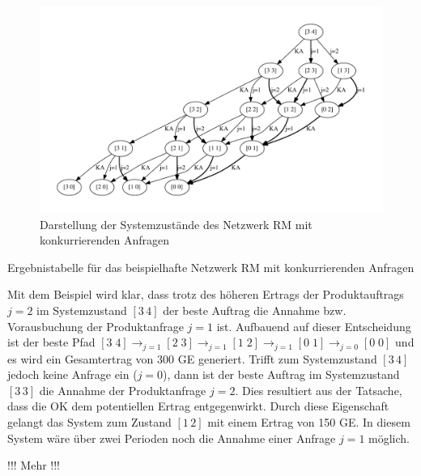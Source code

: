 \begin{figure}[h!]
  \begin{center}
    \includegraphics[width=150mm]{Bilder/Beispiel2.pdf}
    \caption{Darstellung der Systemzustände des Netzwerk RM mit konkurrierenden Anfragen}  \label{B2}
  \end{center}
\end{figure}

\begin{table}
\begin{footnotesize}
    \caption{Ergebnistabelle für das beispielhafte Netzwerk RM mit konkurrierenden Anfragen} \label{Tab2}
          \begin{center}
    \vspace*{3mm}
            \end{center}
\end{footnotesize}
\end{table}

Mit dem Beispiel wird klar, dass trotz des höheren Ertrags der Produktauftrags $j=2$ im Systemzustand $[3\,4]$ der beste Auftrag die Annahme bzw. Vorausbuchung der Produktanfrage $j=1$ ist. Aufbauend auf dieser Entscheidung ist der beste Pfad $[3\;4] \rightarrow_{j=1} [2\;3] \rightarrow_{j=1} [1\;2] \rightarrow_{j=1} [0\;1]\rightarrow_{j=0} [0\;0]$ und es wird ein Gesamtertrag von 300 GE generiert. Trifft zum Systemzustand $[3\,4]$ jedoch keine Anfrage ein ($j=0$), dann ist der beste Auftrag im Systemzustand $[3\,3]$ die Annahme der Produktanfrage $j=2$. Dies resultiert aus der Tatsache, dass die OK dem potentiellen Ertrag entgegenwirkt. Durch diese Eigenschaft gelangt das System zum Zustand $[1\,2]$ mit einem Ertrag von 150 GE. In diesem System wäre über zwei Perioden noch die Annahme einer Anfrage $j=1$ möglich.

!!! Mehr !!!